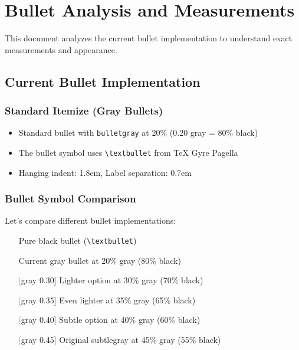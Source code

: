 \documentclass[11pt,letterpaper]{article}
\begin{document}
\section{Bullet Analysis and Measurements}

This document analyzes the current bullet implementation to understand exact measurements and appearance.

\subsection{Current Bullet Implementation}

\subsubsection{Standard Itemize (Gray Bullets)}

\begin{itemize}
\item Standard bullet with \texttt{bulletgray} at 20\% (0.20 gray = 80\% black)
\item The bullet symbol uses \texttt{\textbackslash textbullet} from TeX Gyre Pagella
\item Hanging indent: 1.8em, Label separation: 0.7em
\end{itemize}

\subsubsection{Bullet Symbol Comparison}

Let's compare different bullet implementations:

\begin{itemize}
\item[\textbullet] Pure black bullet (\texttt{\textbackslash textbullet})
\item[\textcolor{bulletgray}{\textbullet}] Current gray bullet at 20\% gray (80\% black)
\item[\textcolor{gray}[gray]{0.30}{\textbullet}] Lighter option at 30\% gray (70\% black)
\item[\textcolor{gray}[gray]{0.35}{\textbullet}] Even lighter at 35\% gray (65\% black)
\item[\textcolor{gray}[gray]{0.40}{\textbullet}] Subtle option at 40\% gray (60\% black)
\item[\textcolor{gray}[gray]{0.45}{\textbullet}] Original subtlegray at 45\% gray (55\% black)
\end{itemize}
\end{document}
